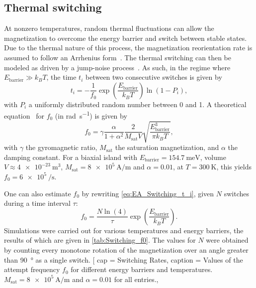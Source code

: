 \documentclass[twocolumn]{phdsymp}
\begin{document}
\subsection{Thermal switching}
At nonzero temperatures, random thermal fluctuations can allow the magnetization to overcome the energy barrier and switch between stable states. Due to the thermal nature of this process, the magnetization reorientation rate is assumed to follow an Arrhenius form~\cite{FAR-13}. The thermal switching can then be modeled as driven by a jump-noise process~\cite{MagDynamics_JumpNoise}. As such, in the regime where $E_{\mathrm{barrier}} \gg k_B T$, the time $t_i$ between two consecutive switches is given by
\begin{equation}
    t_i = -\frac{1}{f_0}\exp(\frac{E_{\mathrm{barrier}}}{k_B T}) \ln(1-P_i) \mathrm{,}
    \label{eq:EA_Switching_t_i}
\end{equation}
with $P_i$ a uniformly distributed random number between 0 and 1. A theoretical equation~\cite{MuMax3,LEL-17b,f0_mumax3_reference} for $f_0$ (in \si{\radian\per\second}) is given by
\begin{equation}
    f_0 = \gamma \frac{\alpha}{1+\alpha^2} \frac{2}{M_{\mathrm{sat}} V} \sqrt{\frac{E_{\mathrm{barrier}}^3}{\pi k_B T}} \mathrm{,}
    \label{eq:EA_Switching_theoretical}
\end{equation}
with $\gamma$ the gyromagnetic ratio, $M_{\mathrm{sat}}$ the saturation magnetization, and $\alpha$ the damping constant.
For a biaxial island with $E_{\mathrm{barrier}}=\SI{154.7}{\milli\electronvolt}$, volume $V\approx\SI{4e-23}{\metre\cubed}$, $M_{\mathrm{sat}}=\SI{8e5}{\ampere\per\metre}$ and $\alpha=0.01$, at $T=\SI{300}{\kelvin}$, this yields $f_0=\SI{6e5}{\per\second}$. \par
One can also estimate $f_0$ by rewriting \cref{eq:EA_Switching_t_i}, given $N$ switches during a time interval $\tau$:
\begin{equation}
    f_0 = \frac{N \ln(4)}{\tau} \exp(\frac{E_{\mathrm{barrier}}}{k_B T}) \mathrm{.}
\end{equation}
Simulations were carried out for various temperatures and energy barriers, the results of which are given in \cref{tab:Switching_f0}. The values for $N$ were obtained by counting every monotone rotation of the magnetization over an angle greater than \SI{90}{\degree} as a single switch.
\ctable[
    cap = Switching Rates,
    caption = {Values of the attempt frequency $f_0$ for different energy barriers and temperatures. $M_{\mathrm{sat}}=\SI{8e5}{\ampere\per\metre}$ and $\alpha=0.01$ for all entries.},
\end{document}
